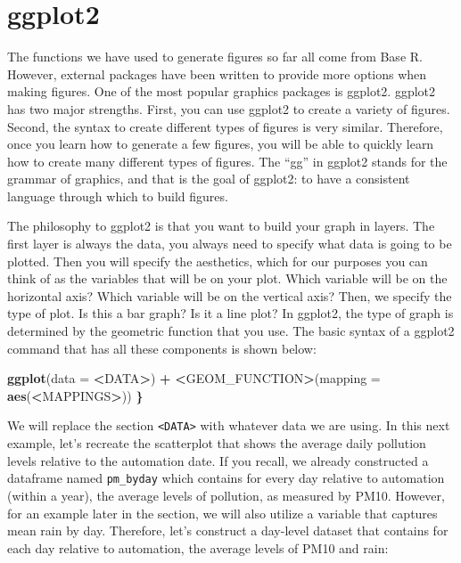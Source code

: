 \documentclass[
]{book}
\newenvironment{Shaded}{\begin{snugshade}}{\end{snugshade}}
\newcommand{\AttributeTok}[1]{\textcolor[rgb]{0.13,0.29,0.53}{#1}}
\newcommand{\ErrorTok}[1]{\textcolor[rgb]{0.64,0.00,0.00}{\textbf{#1}}}
\newcommand{\FunctionTok}[1]{\textcolor[rgb]{0.13,0.29,0.53}{\textbf{#1}}}
\newcommand{\NormalTok}[1]{#1}
\newcommand{\SpecialCharTok}[1]{\textcolor[rgb]{0.81,0.36,0.00}{\textbf{#1}}}
\begin{document}
\section{ggplot2}\label{ggplot2}

The functions we have used to generate figures so far all come from Base R. However, external packages have been written to provide more options when making figures. One of the most popular graphics packages is ggplot2. ggplot2 has two major strengths. First, you can use ggplot2 to create a variety of figures. Second, the syntax to create different types of figures is very similar. Therefore, once you learn how to generate a few figures, you will be able to quickly learn how to create many different types of figures. The ``gg'' in ggplot2 stands for the grammar of graphics, and that is the goal of ggplot2: to have a consistent language through which to build figures.

The philosophy to ggplot2 is that you want to build your graph in layers. The first layer is always the data, you always need to specify what data is going to be plotted. Then you will specify the aesthetics, which for our purposes you can think of as the variables that will be on your plot. Which variable will be on the horizontal axis? Which variable will be on the vertical axis? Then, we specify the type of plot. Is this a bar graph? Is it a line plot? In ggplot2, the type of graph is determined by the geometric function that you use. The basic syntax of a ggplot2 command that has all these components is shown below:

\begin{Shaded}
\begin{Highlighting}[]
\FunctionTok{ggplot}\NormalTok{(}\AttributeTok{data =} \SpecialCharTok{\textless{}}\NormalTok{DATA}\SpecialCharTok{\textgreater{}}\NormalTok{) }\SpecialCharTok{+} 
  \ErrorTok{\textless{}}\NormalTok{GEOM\_FUNCTION}\SpecialCharTok{\textgreater{}}\NormalTok{(}\AttributeTok{mapping =} \FunctionTok{aes}\NormalTok{(}\SpecialCharTok{\textless{}}\NormalTok{MAPPINGS}\SpecialCharTok{\textgreater{}}\NormalTok{))}
 \ErrorTok{\}}
\end{Highlighting}
\end{Shaded}

We will replace the section \texttt{\textless{}DATA\textgreater{}} with whatever data we are using. In this next example, let's recreate the scatterplot that shows the average daily pollution levels relative to the automation date. If you recall, we already constructed a dataframe named \texttt{pm\_byday} which contains for every day relative to automation (within a year), the average levels of pollution, as measured by PM10. However, for an example later in the section, we will also utilize a variable that captures mean rain by day. Therefore, let's construct a day-level dataset that contains for each day relative to automation, the average levels of PM10 and rain:
\end{document}

